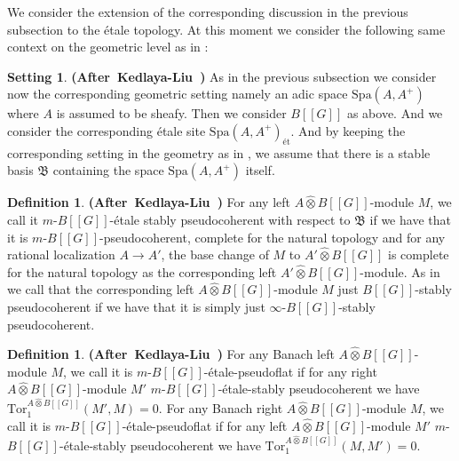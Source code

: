 \documentclass[12pt]{amsart}
\theoremstyle{definition}
\newtheorem{definition}[theorem]{Definition}
\numberwithin{equation}{section}
\newtheorem{setting}[theorem]{Setting}
\begin{document}
\indent We consider the extension of the corresponding discussion in the previous subsection to the \'etale topology. At this moment we consider the following same context on the geometric level as in \cite{KL2}:


\begin{setting} \mbox{\bf{(After Kedlaya-Liu \cite[Hypothesis 2.5.8]{KL2})}} \label{setting3.16}
As in the previous subsection we consider now the corresponding geometric setting namely an adic space $\mathrm{Spa}(A,A^+)$ where $A$ is assumed to be sheafy. Then we consider $B[[G]]$ as above. And we consider the corresponding \'etale site $\mathrm{Spa}(A,A^+)_\text{\'et}$. And by keeping the corresponding setting in the geometry as in \cite[Hypothesis 2.5.8]{KL2}, we assume that there is a stable basis $\mathfrak{B}$ containing the space $\mathrm{Spa}(A,A^+)$ itself.	
\end{setting}


\begin{definition} \mbox{\bf{(After Kedlaya-Liu \cite[Definition 2.5.9]{KL2})}}
For any left $A\widehat{\otimes}B[[G]]$-module $M$, we call it $m$-$B[[G]]$-\'etale stably pseudocoherent with respect to $\mathfrak{B}$ if we have that it is $m$-$B[[G]]$-pseudocoherent, complete for the natural topology and for any rational localization $A\rightarrow A'$, the base change of $M$ to $A'\widehat{\otimes} B[[G]]$ is complete for the natural topology as the corresponding left $A'\widehat{\otimes} B[[G]]$-module.	As in \cite[Definition 2.4.1]{KL2} we call that the corresponding left $A\widehat{\otimes}B[[G]]$-module $M$ just $B[[G]]$-stably pseudocoherent if we have that it is simply just $\infty$-$B[[G]]$-stably pseudocoherent.
\end{definition}






\begin{definition}\mbox{\bf{(After Kedlaya-Liu \cite[Below Definition 2.5.9]{KL2})}}
For any Banach left $A\widehat{\otimes}B[[G]]$-module $M$, we call it is $m$-$B[[G]]$-\'etale-pseudoflat if for any right $A\widehat{\otimes}B[[G]]$-module $M'$ $m$-$B[[G]]$-\'etale-stably pseudocoherent we have $\mathrm{Tor}_1^{A\widehat{\otimes}B[[G]]}(M',M)=0$. For any Banach right $A\widehat{\otimes}B[[G]]$-module $M$, we call it is $m$-$B[[G]]$-\'etale-pseudoflat if for any left $A\widehat{\otimes}B[[G]]$-module $M'$ $m$-$B[[G]]$-\'etale-stably pseudocoherent we have $\mathrm{Tor}_1^{A\widehat{\otimes}B[[G]]}(M,M')=0$.
\end{definition}
\end{document}
